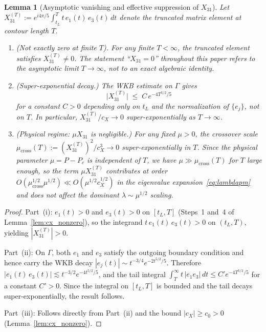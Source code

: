 \documentclass[12pt,a4paper]{amsart}
\newtheorem{lemma}[theorem]{Lemma}
\theoremstyle{remark}
\begin{document}
\begin{lemma}[Asymptotic vanishing and effective suppression of $X_{31}$]
\label{lem:X31_asymptotic}
Let $X_{31}^{(T)} := e^{i4\pi/5}\int_{t_L}^{T} t\,e_1(t)\,e_3(t)\,dt$ denote the
truncated matrix element at contour length $T$.
\begin{enumerate}
\item[(i)] \emph{(Not exactly zero at finite $T$).}
  For any finite $T < \infty$, the truncated element satisfies $X_{31}^{(T)} \neq 0$.
  The statement ``$X_{31} = 0$'' throughout this paper refers to the asymptotic limit
  $T \to \infty$, not to an exact algebraic identity.
\item[(ii)] \emph{(Super-exponential decay.)}
  The WKB estimate on $\Gamma$ gives
  \[
    \bigl|X_{31}^{(T)}\bigr| \;\leq\; C\,e^{-4T^{5/2}/5}
  \]
  for a constant $C > 0$ depending only on $t_L$ and the normalization of
  $\{e_j\}$, not on $T$.  In particular,
  $X_{31}^{(T)}/c_X \to 0$ super-exponentially as $T\to\infty$.
\item[(iii)] \emph{(Physical regime: $\mu X_{31}$ is negligible.)}
  For any fixed $\mu > 0$, the crossover scale
  $\mu_{\mathrm{cross}}(T) := (X_{31}^{(T)})^2/c_X^3 \to 0$
  super-exponentially in $T$.
  Since the physical parameter $\mu = P - P_c$ is independent of $T$, we have
  $\mu \gg \mu_{\mathrm{cross}}(T)$ for $T$ large enough, so the term $\mu X_{31}^{(T)}$
  contributes at order $O(\mu_{\mathrm{cross}}^{1/2} \mu^{1/2}) \ll O(\mu^{1/2} c_X^{1/2})$
  in the eigenvalue expansion~\eqref{eq:lambdapm} and does not affect the
  dominant $\lambda \sim \mu^{1/2}$ scaling.
\end{enumerate}
\end{lemma}

\begin{proof}
Part~(i): $e_1(t) > 0$ and $e_3(t) > 0$ on $[t_L, T]$ (Steps~1 and~4 of
Lemma~\ref{lem:cx_nonzero}), so the integrand $t\,e_1(t)\,e_3(t) > 0$
on $(t_L, T)$, yielding $|X_{31}^{(T)}| > 0$.

Part~(ii): On $\Gamma$, both $e_1$ and $e_3$ satisfy the outgoing boundary condition
and hence carry the WKB decay $|e_j(t)| \sim t^{-3/4}e^{-2t^{5/2}/5}$.
Therefore $|e_1(t)\,e_3(t)| \lesssim t^{-3/2}e^{-4t^{5/2}/5}$, and the tail integral
$\int_T^\infty t\,|e_1 e_3|\,dt \leq C' e^{-4T^{5/2}/5}$
for a constant $C' > 0$.  Since the integral on $[t_L, T]$ is bounded and the
tail decays super-exponentially, the result follows.

Part~(iii): Follows directly from Part~(ii) and the bound $|c_X| \geq c_0 > 0$
(Lemma~\ref{lem:cx_nonzero}).
\end{proof}
\end{document}
